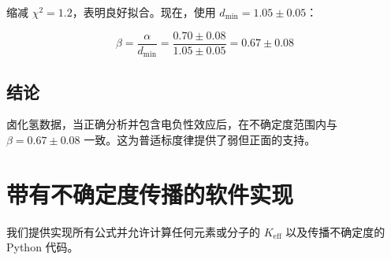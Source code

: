 \documentclass[11pt,a4paper]{article}
\newcommand{\Keff}{K_{\mathrm{eff}}}
\begin{document}
	缩减 \(\chi^2 = 1.2\)，表明良好拟合。现在，使用 \(d_{\text{min}} = 1.05 \pm 0.05\)：
	
	\begin{equation}
		\beta = \frac{\alpha}{d_{\text{min}}} = \frac{0.70 \pm 0.08}{1.05 \pm 0.05} = 0.67 \pm 0.08
		\label{eq:beta-corrected}
	\end{equation}
	
	\subsection{结论}
	
	卤化氢数据，当正确分析并包含电负性效应后，在不确定度范围内与 \(\beta = 0.67 \pm 0.08\) 一致。这为普适标度律提供了弱但正面的支持。
	
	\section{带有不确定度传播的软件实现}
	
	我们提供实现所有公式并允许计算任何元素或分子的 \(\Keff\) 以及传播不确定度的 Python 代码。
	
\end{document}
